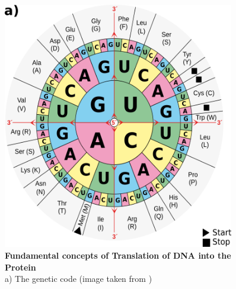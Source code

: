 \begin{figure}[tb]
    \centering
    \begin{minipage}[h]{0.9\textwidth}
      \centering
      \includegraphics[width=0.9\textwidth]{images/Mutations.png}
      \caption{\textbf{Fundamental concepts of Translation of DNA into the Protein}\\
      a) The genetic code (image taken from \textcite{bresch2013})}
     \label{fig:Abb1.5}
    \end{minipage}
  \end{figure} 
